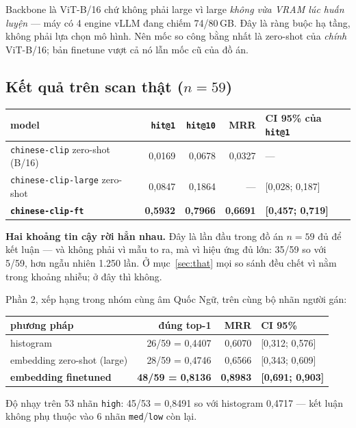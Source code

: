 \documentclass[11pt,a4paper]{article}
\newcommand{\code}[1]{\texttt{#1}}
\begin{document}
Backbone là ViT-B/16 chứ không phải large vì large \emph{không vừa VRAM lúc huấn luyện} --- máy có 4
engine vLLM đang chiếm 74/80\,GB. Đây là ràng buộc hạ tầng, không phải lựa chọn mô hình. Nên mốc so
công bằng nhất là zero-shot của \emph{chính} ViT-B/16; bản finetune vượt cả nó lẫn mốc cũ của đồ án.

\subsection{Kết quả trên scan thật ($n = 59$)}

\begin{center}
\begin{tabular}{lrrrl}
\toprule
model & \code{hit@1} & \code{hit@10} & MRR & CI 95\% của \code{hit@1} \\
\midrule
\code{chinese-clip} zero-shot (B/16) & 0,0169 & 0,0678 & 0,0327 & --- \\
\code{chinese-clip-large} zero-shot & 0,0847 & 0,1864 & --- & [0,028; 0,187] \\
\textbf{\code{chinese-clip-ft}} & \textbf{0,5932} & \textbf{0,7966} & \textbf{0,6691} &
\textbf{[0,457; 0,719]} \\
\bottomrule
\end{tabular}
\end{center}

\textbf{Hai khoảng tin cậy rời hẳn nhau.} Đây là lần đầu trong đồ án $n = 59$ đủ để kết luận --- và
không phải vì mẫu to ra, mà vì hiệu ứng đủ lớn: 35/59 so với 5/59, hơn ngẫu nhiên 1.250 lần. Ở
mục~\ref{sec:that} mọi so sánh đều chết vì nằm trong khoảng nhiễu; ở đây thì không.

Phần 2, xếp hạng trong nhóm cùng âm Quốc Ngữ, trên cùng bộ nhãn người gán:

\begin{center}
\begin{tabular}{lrrl}
\toprule
phương pháp & đúng top-1 & MRR & CI 95\% \\
\midrule
histogram & 26/59 = 0,4407 & 0,6070 & [0,312; 0,576] \\
embedding zero-shot (large) & 28/59 = 0,4746 & 0,6566 & [0,343; 0,609] \\
\textbf{embedding finetuned} & \textbf{48/59 = 0,8136} & \textbf{0,8983} & \textbf{[0,691; 0,903]} \\
\bottomrule
\end{tabular}
\end{center}

Độ nhạy trên 53 nhãn \code{high}: 45/53 = 0,8491 so với histogram 0,4717 --- kết luận không phụ
thuộc vào 6 nhãn \code{med}/\code{low} còn lại.
\end{document}
